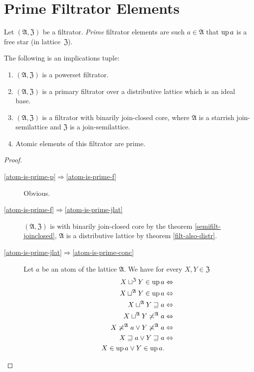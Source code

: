 \section{Prime Filtrator Elements}
\begin{defn}
Let $(\mathfrak{A},\mathfrak{Z})$ be a filtrator. \emph{Prime} filtrator elements are such $a\in\mathfrak{A}$
that $\operatorname{up} a$ is a free star (in lattice~$\mathfrak{Z}$).\end{defn}
\begin{prop}
\label{atom-is-prime}The following is an implications tuple:
\begin{enumerate}
\item \label{atom-is-prime-p}$(\mathfrak{A},\mathfrak{Z})$ is a powerset
filtrator.
\item \label{atom-is-prime-f}$(\mathfrak{A},\mathfrak{Z})$ is a primary
filtrator over a distributive lattice which is an
ideal base.
\item \label{atom-is-prime-jlat}$(\mathfrak{A},\mathfrak{Z})$ is a filtrator with binarily join-closed core, where $\mathfrak{A}$ is
a starrish join-semilattice and $\mathfrak{Z}$ is a join-semilattice.
\item \label{atom-is-prime-conc}Atomic elements of this filtrator are prime.
\end{enumerate}
\end{prop}
\begin{proof}
~
\begin{description}
\item [{\ref{atom-is-prime-p}$\Rightarrow$\ref{atom-is-prime-f}}] Obvious.
\item [{\ref{atom-is-prime-f}$\Rightarrow$\ref{atom-is-prime-jlat}}] $(\mathfrak{A},\mathfrak{Z})$
is with binarily join-closed core by the theorem \ref{semifilt-joinclosed},
$\mathfrak{A}$ is a distributive lattice by theorem \ref{filt-also-distr}.
\item [{\ref{atom-is-prime-jlat}$\Rightarrow$\ref{atom-is-prime-conc}}] Let
$a$ be an atom of the lattice $\mathfrak{A}$. We have for every
$X,Y\in\mathfrak{Z}$
\begin{align*}
X\sqcup^{\mathfrak{Z}}Y\in\operatorname{up} a & \Leftrightarrow\\
X\sqcup^{\mathfrak{A}}Y\in\operatorname{up} a & \Leftrightarrow\\
X\sqcup^{\mathfrak{A}}Y\sqsupseteq a & \Leftrightarrow\\
X\sqcup^{\mathfrak{A}}Y\not\asymp^{\mathfrak{A}}a & \Leftrightarrow\\
X\not\asymp^{\mathfrak{A}}a\lor Y\not\asymp^{\mathfrak{A}}a & \Leftrightarrow\\
X\sqsupseteq a\lor Y\sqsupseteq a & \Leftrightarrow\\
X\in\operatorname{up} a\lor Y\in\operatorname{up} a.
\end{align*}

\end{description}
\end{proof}
